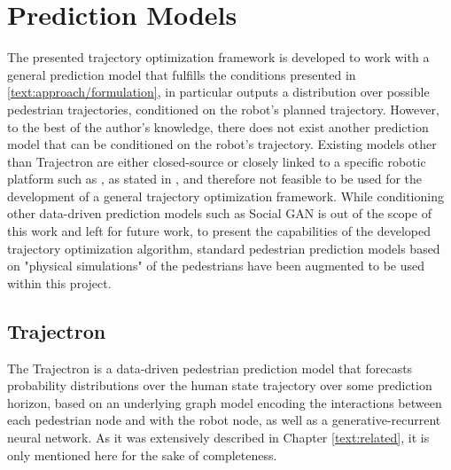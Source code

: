 \section{Prediction Models}
\label{text:experiments/environments}
The presented trajectory optimization framework is developed to work with a general prediction model that fulfills the conditions presented in \ref{text:approach/formulation}, in particular outputs a distribution over possible pedestrian trajectories, conditioned on the robot's planned trajectory. However, to the best of the author's knowledge, there does not exist another prediction model that can be conditioned on the robot's trajectory. Existing models other than Trajectron \cite{Salzmann2020} are either closed-source or closely linked to a specific robotic platform such as \cite{Casas2019}\cite{Casas2018}\cite{Britz2017}\cite{Jain2019}, as stated in \cite{Salzmann2020}, and therefore not feasible to be used for the development of a general trajectory optimization framework. While conditioning other data-driven prediction models such as Social GAN \cite{Gupta2018} is out of the scope of this work and left for future work, to present the capabilities of the developed trajectory optimization algorithm, standard pedestrian prediction models based on "physical simulations" of the pedestrians have been augmented to be used within this project.

\subsection{Trajectron}
The Trajectron \cite{Ivanovic2018}\cite{Salzmann2020} is a data-driven pedestrian prediction model that forecasts probability distributions over the human state trajectory over some prediction horizon, based on an underlying graph model encoding the interactions between each pedestrian node and with the robot node, as well as a generative-recurrent neural network. As it was extensively described in Chapter \ref{text:related}, it is only mentioned here for the sake of completeness. 

